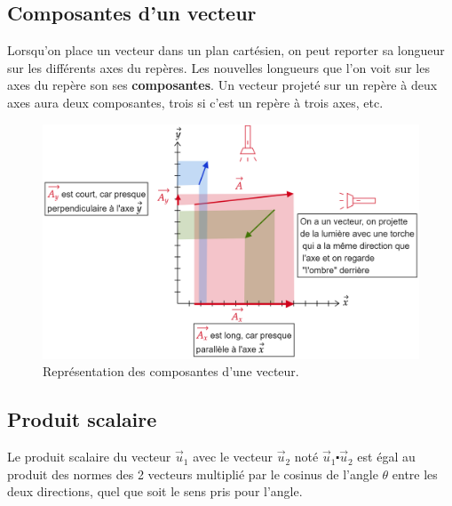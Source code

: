 \documentclass[
	11pt, %
	fleqn, %
	a4paper, %
]{LegrandOrangeBook}
\begin{document}
\subsection{Composantes d'un vecteur}


\begin{theorem}
Lorsqu’on place un vecteur dans un plan cartésien, on peut reporter sa longueur sur les différents axes du repères. Les nouvelles longueurs que l'on voit sur les axes du repère son ses \textbf{composantes}. Un vecteur projeté sur un repère à deux axes aura deux composantes, trois si c'est un repère à trois axes, etc.
\end{theorem}

\begin{figure}[H] %
	\centering %
	\includegraphics[width=1\textwidth]{Images/compo1.png} %
	\caption{Représentation des composantes d'une vecteur.}
	\label{compo1} %
\end{figure}


\subsection{Produit scalaire}

Le produit scalaire du vecteur $\Vec{u}_1$ avec le vecteur $\Vec{u}_2$ noté $\Vec{u}_1 \centerdot \Vec{u}_2$ est égal au produit des normes des 2
vecteurs multiplié par le cosinus de l’angle $\theta$ entre les deux directions, quel que soit le sens pris pour l’angle.
\end{document}
